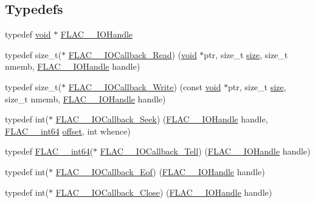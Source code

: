 \subsection*{Typedefs}
\begin{DoxyCompactItemize}
\item 
typedef \mbox{\hyperlink{_s_d_l__opengles2__gl2ext_8h_ae5d8fa23ad07c48bb609509eae494c95}{void}} $\ast$ \mbox{\hyperlink{group__flac__callbacks_ga4c329c3168dee6e352384c5e9306260d}{F\+L\+A\+C\+\_\+\+\_\+\+I\+O\+Handle}}
\item 
typedef size\+\_\+t($\ast$ \mbox{\hyperlink{group__flac__callbacks_ga49d95218a6c09b215cd92cc96de71bf9}{F\+L\+A\+C\+\_\+\+\_\+\+I\+O\+Callback\+\_\+\+Read}}) (\mbox{\hyperlink{_s_d_l__opengles2__gl2ext_8h_ae5d8fa23ad07c48bb609509eae494c95}{void}} $\ast$ptr, size\+\_\+t \mbox{\hyperlink{_s_d_l__opengl__glext_8h_a3d1e3edfcf61ca2d831883e1afbad89e}{size}}, size\+\_\+t nmemb, \mbox{\hyperlink{group__flac__callbacks_ga4c329c3168dee6e352384c5e9306260d}{F\+L\+A\+C\+\_\+\+\_\+\+I\+O\+Handle}} handle)
\item 
typedef size\+\_\+t($\ast$ \mbox{\hyperlink{group__flac__callbacks_gad991792235879aecae289b56a112e1b8}{F\+L\+A\+C\+\_\+\+\_\+\+I\+O\+Callback\+\_\+\+Write}}) (const \mbox{\hyperlink{_s_d_l__opengles2__gl2ext_8h_ae5d8fa23ad07c48bb609509eae494c95}{void}} $\ast$ptr, size\+\_\+t \mbox{\hyperlink{_s_d_l__opengl__glext_8h_a3d1e3edfcf61ca2d831883e1afbad89e}{size}}, size\+\_\+t nmemb, \mbox{\hyperlink{group__flac__callbacks_ga4c329c3168dee6e352384c5e9306260d}{F\+L\+A\+C\+\_\+\+\_\+\+I\+O\+Handle}} handle)
\item 
typedef int($\ast$ \mbox{\hyperlink{group__flac__callbacks_gab3942bbbd6ae09bcefe7cb3a0060c49c}{F\+L\+A\+C\+\_\+\+\_\+\+I\+O\+Callback\+\_\+\+Seek}}) (\mbox{\hyperlink{group__flac__callbacks_ga4c329c3168dee6e352384c5e9306260d}{F\+L\+A\+C\+\_\+\+\_\+\+I\+O\+Handle}} handle, \mbox{\hyperlink{ordinals_8h_a12b57f75f760b9062a13bcda1bdb3f3e}{F\+L\+A\+C\+\_\+\+\_\+int64}} \mbox{\hyperlink{_s_d_l__opengl__glext_8h_ac915cd848f42b26af51745f204a3b9af}{offset}}, int whence)
\item 
typedef \mbox{\hyperlink{ordinals_8h_a12b57f75f760b9062a13bcda1bdb3f3e}{F\+L\+A\+C\+\_\+\+\_\+int64}}($\ast$ \mbox{\hyperlink{group__flac__callbacks_ga45314930cabc2e9c04867eae6bca309f}{F\+L\+A\+C\+\_\+\+\_\+\+I\+O\+Callback\+\_\+\+Tell}}) (\mbox{\hyperlink{group__flac__callbacks_ga4c329c3168dee6e352384c5e9306260d}{F\+L\+A\+C\+\_\+\+\_\+\+I\+O\+Handle}} handle)
\item 
typedef int($\ast$ \mbox{\hyperlink{group__flac__callbacks_ga00ae3b3d373e691908e9539ebf720675}{F\+L\+A\+C\+\_\+\+\_\+\+I\+O\+Callback\+\_\+\+Eof}}) (\mbox{\hyperlink{group__flac__callbacks_ga4c329c3168dee6e352384c5e9306260d}{F\+L\+A\+C\+\_\+\+\_\+\+I\+O\+Handle}} handle)
\item 
typedef int($\ast$ \mbox{\hyperlink{group__flac__callbacks_ga0032267fac38220689778833e08f7387}{F\+L\+A\+C\+\_\+\+\_\+\+I\+O\+Callback\+\_\+\+Close}}) (\mbox{\hyperlink{group__flac__callbacks_ga4c329c3168dee6e352384c5e9306260d}{F\+L\+A\+C\+\_\+\+\_\+\+I\+O\+Handle}} handle)
\end{DoxyCompactItemize}


